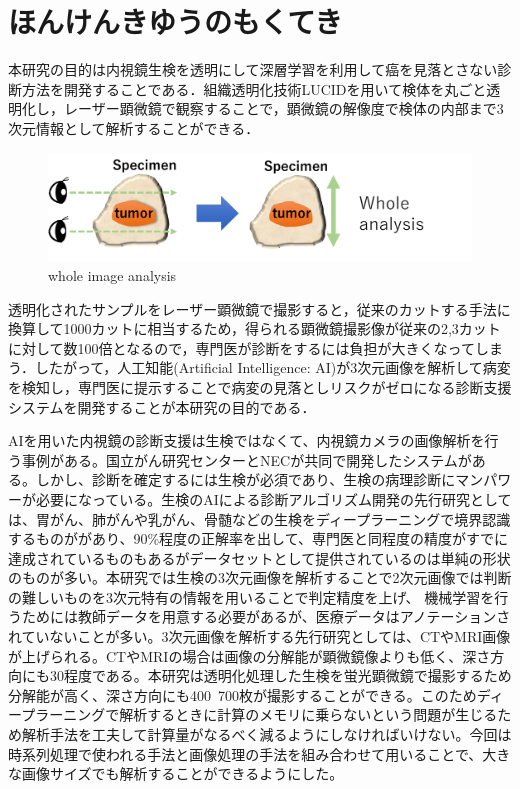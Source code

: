 \section{ほんけんきゆうのもくてき}
本研究の目的は内視鏡生検を透明にして深層学習を利用して癌を見落とさない診断方法を開発することである．組織透明化技術LUCIDを用いて検体を丸ごと透明化し，レーザー顕微鏡で観察することで，顕微鏡の解像度で検体の内部まで3次元情報として解析することができる．

\begin{figure}[H]
	\centering
	\includegraphics[width=0.7\linewidth]{fig/chapter1/whole_image_analysis}
	\caption{whole image analysis}
	\label{fig:wholeimageanalysis}
\end{figure}


透明化されたサンプルをレーザー顕微鏡で撮影すると，従来のカットする手法に換算して1000カットに相当するため，得られる顕微鏡撮影像が従来の2,3カットに対して数100倍となるので，専門医が診断をするには負担が大きくなってしまう．したがって，人工知能(Artificial Intelligence: AI)が3次元画像を解析して病変を検知し，専門医に提示することで病変の見落としリスクがゼロになる診断支援システムを開発することが本研究の目的である．

AIを用いた内視鏡の診断支援は生検ではなくて、内視鏡カメラの画像解析を行う事例がある。国立がん研究センターとNECが共同で開発したシステムがある。しかし、診断を確定するには生検が必須であり、生検の病理診断にマンパワーが必要になっている。生検のAIによる診断アルゴリズム開発の先行研究としては、胃がん、肺がんや乳がん、骨髄などの生検をディープラーニングで境界認識するものががあり、90\%程度の正解率を出して、専門医と同程度の精度がすでに達成されているものもあるがデータセットとして提供されているのは単純の形状のものが多い。本研究では生検の3次元画像を解析することで2次元画像では判断の難しいものを3次元特有の情報を用いることで判定精度を上げ、
機械学習を行うためには教師データを用意する必要があるが、医療データはアノテーションされていないことが多い。3次元画像を解析する先行研究としては、CTやMRI画像が上げられる。CTやMRIの場合は画像の分解能が顕微鏡像よりも低く、深さ方向にも30程度である。本研究は透明化処理した生検を蛍光顕微鏡で撮影するため分解能が高く、深さ方向にも400~700枚が撮影することができる。このためディープラーニングで解析するときに計算のメモリに乗らないという問題が生じるため解析手法を工夫して計算量がなるべく減るようにしなければいけない。今回は時系列処理で使われる手法と画像処理の手法を組み合わせて用いることで、大きな画像サイズでも解析することができるようにした。


